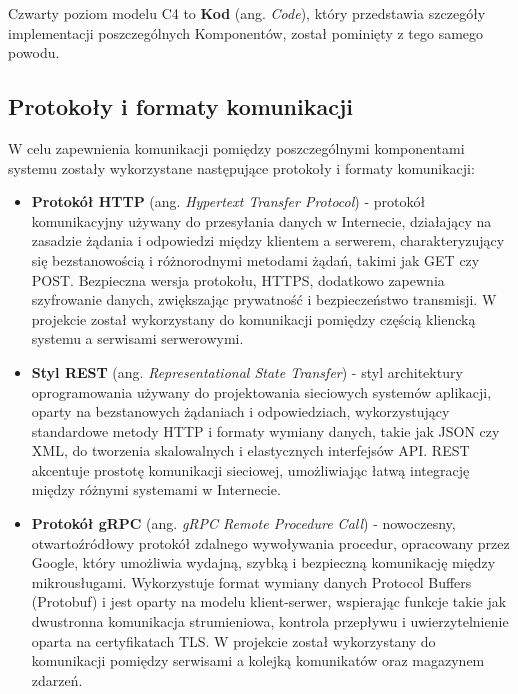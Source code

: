 Czwarty poziom modelu C4 to \textbf{Kod} (ang. \textit{Code}), który przedstawia szczegóły implementacji poszczególnych Komponentów, został pominięty z tego samego powodu.


\subsection{Protokoły i formaty komunikacji}

W celu zapewnienia komunikacji pomiędzy poszczególnymi komponentami systemu zostały wykorzystane następujące protokoły i formaty komunikacji:

\begin{itemize}

    \item \textbf{Protokół HTTP} (ang. \textit{Hypertext Transfer Protocol}) - protokół komunikacyjny używany do przesyłania danych w Internecie, działający na zasadzie żądania i odpowiedzi między klientem a serwerem, charakteryzujący się bezstanowością i różnorodnymi metodami żądań, takimi jak GET czy POST. Bezpieczna wersja protokołu, HTTPS, dodatkowo zapewnia szyfrowanie danych, zwiększając prywatność i bezpieczeństwo transmisji. W projekcie został wykorzystany do komunikacji pomiędzy częścią kliencką systemu a serwisami serwerowymi.

    \item \textbf{Styl REST} (ang. \textit{Representational State Transfer}) - styl architektury oprogramowania używany do projektowania sieciowych systemów aplikacji, oparty na bezstanowych żądaniach i odpowiedziach, wykorzystujący standardowe metody HTTP i formaty wymiany danych, takie jak JSON czy XML, do tworzenia skalowalnych i elastycznych interfejsów API. REST akcentuje prostotę komunikacji sieciowej, umożliwiając łatwą integrację między różnymi systemami w Internecie.
    
    \item \textbf{Protokół gRPC} (ang. \textit{gRPC Remote Procedure Call}) - nowoczesny, otwartoźródłowy protokół zdalnego wywoływania procedur, opracowany przez Google, który umożliwia wydajną, szybką i bezpieczną komunikację między mikrousługami. Wykorzystuje format wymiany danych Protocol Buffers (Protobuf) i jest oparty na modelu klient-serwer, wspierając funkcje takie jak dwustronna komunikacja strumieniowa, kontrola przepływu i uwierzytelnienie oparta na certyfikatach TLS. W projekcie został wykorzystany do komunikacji pomiędzy serwisami a kolejką komunikatów oraz magazynem zdarzeń.


\end{itemize}
